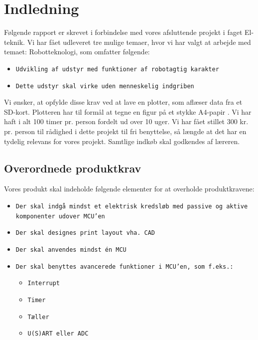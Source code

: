 \chapter{Indledning}
\label{ch:indledning}


Følgende rapport er skrevet i forbindelse med vores afsluttende
projekt i faget El-teknik.  Vi har fået udleveret tre mulige temaer,
hvor vi har valgt at arbejde med temaet: Robotteknologi, som omfatter
følgende:

\begin{itemize}
\item \texttt{Udvikling af udstyr med funktioner af robotagtig karakter}
\item \texttt{Dette udstyr skal virke uden menneskelig indgriben}
\end{itemize}

Vi ønsker, at opfylde disse krav ved at lave en plotter, som aflæser
data fra et SD-kort. Plotteren har til formål at tegne en figur på et
stykke A4-papir . Vi
har haft i alt 100 timer pr. person fordelt ud over 10 uger. Vi har
fået stillet 300 kr. pr. person til rådighed i dette projekt til fri
benyttelse, så længde at det har en tydelig relevans for vores
projekt. Samtlige indkøb skal godkendes af læreren.


\section{Overordnede produktkrav}

Vores produkt skal indeholde følgende elementer for at overholde
produktkravene:

\begin{itemize}
\item \texttt{Der skal indgå mindst et elektrisk kredsløb med passive og
  aktive komponenter udover MCU'en}
\item \texttt{Der skal designes print layout vha. CAD}
\item \texttt{Der skal anvendes mindst én MCU}
\item \texttt{Der skal benyttes avancerede funktioner i MCU'en, som f.eks.:}
  \begin{itemize}
  \item \texttt{Interrupt}
  \item \texttt{Timer}
  \item \texttt{Tæller}
  \item \texttt{U(S)ART eller ADC}
  \end{itemize}
\end{itemize}


